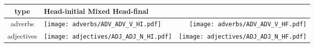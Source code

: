 \documentclass{article}
\begin{document}
\begin{table}
   \begin{tabular}{c | l   r } \hline 
 type & \multicolumn{2}{l}{\hspace{0.5cm} Head-initial\hspace{2cm} Mixed\hspace{2.5cm} Head-final} \\
 \hline
 adverbs & \parbox[c]{14em}{\texttt{[image: adverbs/ADV\_ADV\_V\_HI.pdf]}} & \parbox[c]{15em}{\texttt{[image: adverbs/ADV\_ADV\_V\_HF.pdf]}} \\
adjectives & \parbox[c]{14em}{\texttt{[image: adjectives/ADJ\_ADJ\_N\_HI.pdf]}} & \parbox[c]{15em}{\texttt{[image: adjectives/ADJ\_ADJ\_N\_HF.pdf]}} \\
 \hline
  \end{tabular}
\end{table}
\end{document}
